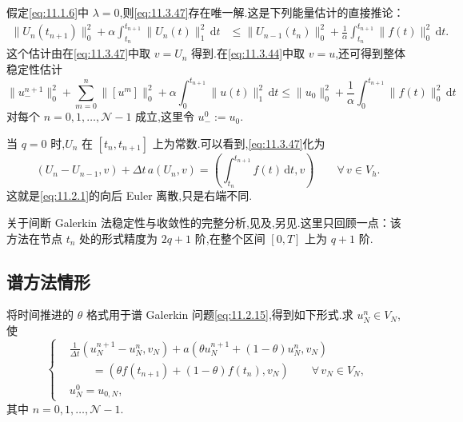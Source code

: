 假定\eqref{eq:11.1.6}中 \(\lambda=0\),则\eqref{eq:11.3.47}存在唯一解.这是下列能量估计的直接推论：
\[
  \begin{aligned}
    \|U_n(t_{n+1})\|_0^2+\alpha\int_{t_n}^{t_{n+1}}\|U_n(t)\|_1^2\,\mathrm dt
       &\le\|U_{n-1}(t_n)\|_0^2+\frac1\alpha\int_{t_n}^{t_{n+1}}\|f(t)\|_0^2\,\mathrm dt .
  \end{aligned}
\]
这个估计由在\eqref{eq:11.3.47}中取 \(v=U_n\) 得到.在\eqref{eq:11.3.44}中取 \(v=u\),还可得到整体稳定性估计
\[
  \|u_-^{n+1}\|_0^2+\sum_{m=0}^n\|[u^m]\|_0^2+
        \alpha\int_0^{t_{n+1}}\|u(t)\|_1^2\,\mathrm dt
     \le\|u_0\|_0^2+\frac1\alpha\int_0^{t_{n+1}}\|f(t)\|_0^2\,\mathrm dt
\]
对每个 \(n=0,1,\ldots,\mathcal N-1\) 成立,这里令 \(u_-^0:=u_0\).

当 \(q=0\) 时,\(U_n\) 在 \([t_n,t_{n+1}]\) 上为常数.可以看到,\eqref{eq:11.3.47}化为
\[
  (U_n-U_{n-1},v)+\Delta t\,a(U_n,v)
        =\left(\int_{t_n}^{t_{n+1}}f(t)\,\mathrm dt,v\right)\qquad\forall\,v\in V_h.
\]
这就是\eqref{eq:11.2.1}的向后 Euler 离散,只是右端不同.

关于间断 Galerkin 法稳定性与收敛性的完整分析,见及,另见.这里只回顾一点：该方法在节点 \(t_n\) 处的形式精度为 \(2q+1\) 阶,在整个区间 \([0,T]\) 上为 \(q+1\) 阶.

\subsection{谱方法情形}\label{sec:11.3.2}

将时间推进的 \(\theta\) 格式用于谱 Galerkin 问题\eqref{eq:11.2.15},得到如下形式.求 \(u_N^n\in V_N\),使
\begin{equation}\label{eq:11.3.48}
  \left\{
  \begin{aligned}
    &\frac1{\Delta t}(u_N^{n+1}-u_N^n,v_N)
        +a(\theta u_N^{n+1}+(1-\theta)u_N^n,v_N)\\
    &\qquad=(\theta f(t_{n+1})+(1-\theta)f(t_n),v_N)
          \qquad\forall\,v_N\in V_N,\\
    &u_N^0=u_{0,N},
  \end{aligned}
  \right.
\end{equation}
其中 \(n=0,1,\ldots,\mathcal N-1\).

